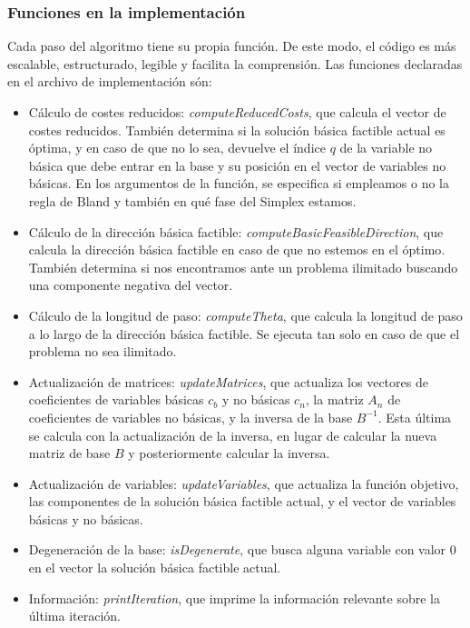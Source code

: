 \documentclass[12pt, titlepage]{article}
\begin{document}
\subsubsection{Funciones en la implementación}
Cada paso del algoritmo tiene su propia función. De este modo, el código es más escalable, estructurado, legible y facilita la comprensión. Las funciones declaradas en el archivo de implementación són:
\begin{itemize}
\item	Cálculo de costes reducidos: \textit{computeReducedCosts}, que calcula el vector de costes reducidos. También determina si la solución básica factible actual es óptima, y en caso de que no lo sea, devuelve el índice $q$ de la variable no básica que debe entrar en la base y su posición en el vector de variables no básicas. En los argumentos de la función, se especifica si empleamos o no la regla de Bland y también en qué fase del Simplex estamos.
\item	Cálculo de la dirección básica factible: \textit{computeBasicFeasibleDirection}, que calcula la dirección básica factible en caso de que no estemos en el óptimo. También determina si nos encontramos ante un problema ilimitado buscando una componente negativa del vector.
\item	Cálculo de la longitud de paso: \textit{computeTheta}, que calcula la longitud de paso a lo largo de la dirección básica factible. Se ejecuta tan solo en caso de que el problema no sea ilimitado.
\item	Actualización de matrices:	\textit{updateMatrices}, que actualiza los vectores de coeficientes de variables básicas $c_b$ y no básicas $c_n$, la matriz $A_n$ de coeficientes de variables no básicas, y la inversa de la base $B^{-1}$. Esta última se calcula con la actualización de la inversa, en lugar de calcular la nueva matriz de base $B$ y posteriormente calcular la inversa.
\item	Actualización de variables:	\textit{updateVariables}, que actualiza la función objetivo, las componentes de la solución básica factible actual, y el vector de variables básicas y no básicas.
\item	Degeneración de la base: \textit{isDegenerate}, que busca alguna variable con valor $0$ en el vector la solución básica factible actual.
\item	Información: \textit{printIteration}, que imprime la información relevante sobre la última iteración.
\end{itemize}
\end{document}

